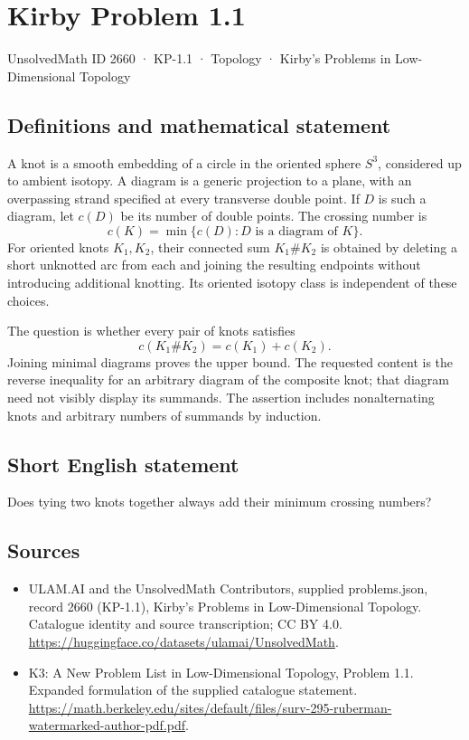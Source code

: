 \documentclass[11pt,a4paper]{article}
\begin{document}
\section*{Kirby Problem 1.1}\label{2660}
{\small UnsolvedMath ID 2660 · KP-1.1 · Topology · Kirby's Problems in Low-Dimensional Topology}
\subsection{Definitions and mathematical statement}
A knot is a smooth embedding of a circle in the oriented sphere $S^3$, considered
up to ambient isotopy. A diagram is a generic projection to a plane, with an
overpassing strand specified at every transverse double point. If $D$ is such a
diagram, let $c(D)$ be its number of double points. The crossing number is
\[
c(K)=\min\{c(D):D\text{ is a diagram of }K\}.
\]
For oriented knots $K_1,K_2$, their connected sum $K_1\#K_2$ is obtained by deleting
a short unknotted arc from each and joining the resulting endpoints without
introducing additional knotting. Its oriented isotopy class is independent of
these choices.

The question is whether every pair of knots satisfies
\[
c(K_1\#K_2)=c(K_1)+c(K_2).
\]
Joining minimal diagrams proves the upper bound. The requested content is the
reverse inequality for an arbitrary diagram of the composite knot; that diagram
need not visibly display its summands. The assertion includes nonalternating knots
and arbitrary numbers of summands by induction.
\subsection{Short English statement}
Does tying two knots together always add their minimum crossing numbers?
\subsection{Sources}
\begin{itemize}
\item[S1] ULAM.AI and the UnsolvedMath Contributors, supplied problems.json, record 2660 (KP-1.1), Kirby's Problems in Low-Dimensional Topology. Catalogue identity and source transcription; CC BY 4.0.
\url{https://huggingface.co/datasets/ulamai/UnsolvedMath}.
\item[S2] K3: A New Problem List in Low-Dimensional Topology, Problem 1.1. Expanded formulation of the supplied catalogue statement.
\url{https://math.berkeley.edu/sites/default/files/surv-295-ruberman-watermarked-author-pdf.pdf}.
\end{itemize}
\end{document}
